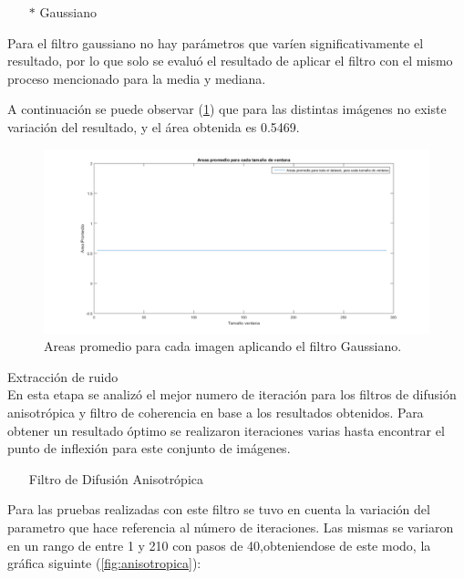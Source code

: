 \begin{itemize}
	\item[$*$]Gaussiano
\end{itemize}

Para el filtro gaussiano no hay parámetros que varíen significativamente el resultado, por lo que solo se evaluó el resultado de aplicar el filtro con el mismo proceso mencionado para la media y mediana. 

A continuaci\'on se puede observar (\ref{fig:gaussiano}) que para las distintas imágenes no existe variación del resultado, y el área obtenida es 0.5469.


\begin{figure}[H]
	{
	\centering
	\includegraphics[width=1\textwidth]{Figures/Gaussiano}
	\caption[Gaussiano]{Areas promedio para cada imagen aplicando el filtro Gaussiano.}
	\label{fig:gaussiano}
	}
\end{figure}

Extracci\'on de ruido\\

En esta etapa se analiz\'o el mejor numero de iteraci\'on para los filtros de difusi\'on anisotr\'opica y filtro de coherencia en base a los resultados obtenidos. Para obtener un resultado \'optimo se realizaron iteraciones varias hasta encontrar el punto de inflexi\'on para este conjunto de im\'agenes.\\


\begin{itemize}
	\item[]Filtro de Difusi\'on Anisotr\'opica
\end{itemize}

Para las pruebas realizadas con este filtro se tuvo en cuenta la variaci\'on del parametro que hace referencia al n\'umero de iteraciones. Las mismas se variaron en un rango de entre 1 y 210 con pasos de 40,obteniendose de este modo, la gr\'afica siguinte (\ref{fig:anisotropica}):

